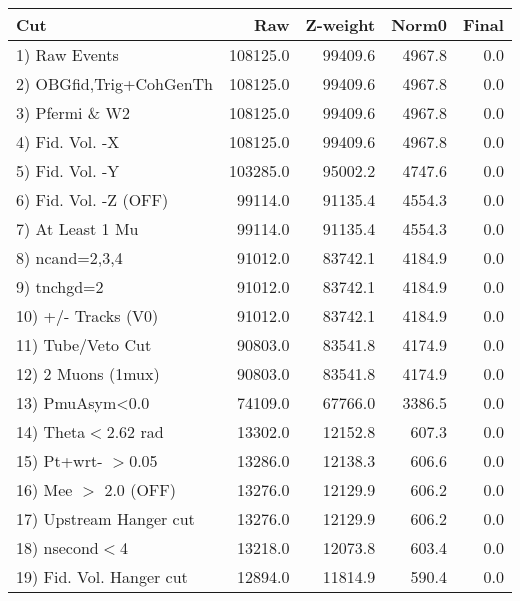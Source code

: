  \begin{table}[h!]\centering
 \begin{tabular}{||l||r|r|r|r||}
 \hline
 \hline
 Cut & Raw & Z-weight & Norm0 & Final \\
 \hline
  1) Raw Events           &    108125.0 &     99409.6 &      4967.8 &         0.0 \\
  2) OBGfid,Trig+CohGenTh &    108125.0 &     99409.6 &      4967.8 &         0.0 \\
  3) Pfermi \& W2         &    108125.0 &     99409.6 &      4967.8 &         0.0 \\
  4) Fid. Vol. -X         &    108125.0 &     99409.6 &      4967.8 &         0.0 \\
  5) Fid. Vol. -Y         &    103285.0 &     95002.2 &      4747.6 &         0.0 \\
  6) Fid. Vol. -Z (OFF)   &     99114.0 &     91135.4 &      4554.3 &         0.0 \\
  7) At Least 1 Mu        &     99114.0 &     91135.4 &      4554.3 &         0.0 \\
  8) ncand=2,3,4          &     91012.0 &     83742.1 &      4184.9 &         0.0 \\
  9) tnchgd=2             &     91012.0 &     83742.1 &      4184.9 &         0.0 \\
 10) +/- Tracks (V0)      &     91012.0 &     83742.1 &      4184.9 &         0.0 \\
 11) Tube/Veto Cut        &     90803.0 &     83541.8 &      4174.9 &         0.0 \\
 12) 2 Muons (1mux)       &     90803.0 &     83541.8 &      4174.9 &         0.0 \\
 13) PmuAsym<0.0          &     74109.0 &     67766.0 &      3386.5 &         0.0 \\
 14) Theta$<$2.62 rad     &     13302.0 &     12152.8 &       607.3 &         0.0 \\
 15) Pt+wrt- $>$0.05      &     13286.0 &     12138.3 &       606.6 &         0.0 \\
 16) Mee $>$ 2.0  (OFF)   &     13276.0 &     12129.9 &       606.2 &         0.0 \\
 17) Upstream Hanger cut  &     13276.0 &     12129.9 &       606.2 &         0.0 \\
 18) nsecond$<$4          &     13218.0 &     12073.8 &       603.4 &         0.0 \\
 19) Fid. Vol. Hanger cut &     12894.0 &     11814.9 &       590.4 &         0.0 \\

\end{tabular}
\end{table}
